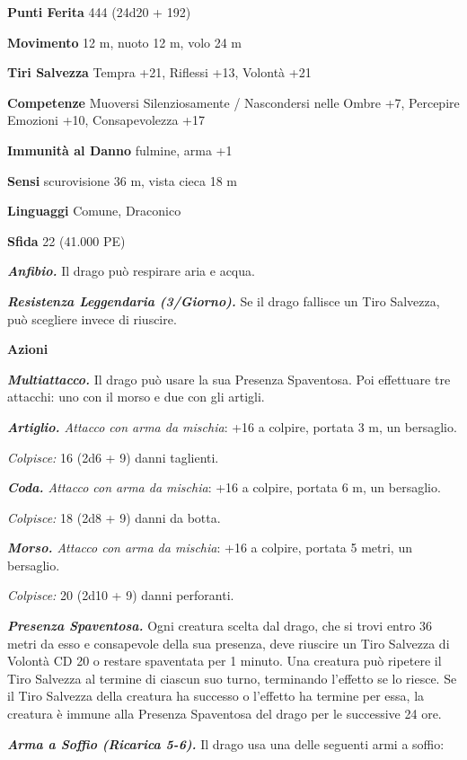 \begin{multicols}{2}
\textbf{Punti Ferita} 444 (24d20 + 192)

\textbf{Movimento} 12 m, nuoto 12 m, volo 24 m

\textbf{Tiri Salvezza} Tempra +21, Riflessi +13, Volontà +21

\textbf{Competenze} Muoversi Silenziosamente / Nascondersi nelle Ombre +7, Percepire Emozioni +10, Consapevolezza +17

\textbf{Immunità al Danno} fulmine, arma +1

\textbf{Sensi} scurovisione 36 m, vista cieca 18 m

\textbf{Linguaggi} Comune, Draconico

\textbf{Sfida} 22 (41.000 PE)

\emph{\textbf{Anfibio.}} Il drago può respirare aria e acqua.

\emph{\textbf{Resistenza Leggendaria (3/Giorno).}} Se il drago fallisce un Tiro Salvezza, può scegliere invece di riuscire.

\textbf{Azioni}

\emph{\textbf{Multiattacco.}} Il drago può usare la sua Presenza Spaventosa. Poi effettuare tre attacchi: uno con il morso e due con gli artigli.

\emph{\textbf{Artiglio.} Attacco con arma da mischia}: +16 a colpire, portata 3 m, un bersaglio.

\emph{Colpisce:} 16 (2d6 + 9) danni taglienti.

\emph{\textbf{Coda.} Attacco con arma da mischia}: +16 a colpire, portata 6 m, un bersaglio.

\emph{Colpisce:} 18 (2d8 + 9) danni da botta.

\emph{\textbf{Morso.} Attacco con arma da mischia}: +16 a colpire, portata 5 metri, un bersaglio.

\emph{Colpisce:} 20 (2d10 + 9) danni perforanti.

\emph{\textbf{Presenza Spaventosa.}} Ogni creatura scelta dal drago, che si trovi entro 36 metri da esso e consapevole della sua presenza, deve riuscire un Tiro Salvezza di Volontà CD 20 o restare spaventata per 1 minuto. Una creatura può ripetere il Tiro Salvezza al termine di ciascun suo turno, terminando l'effetto se lo riesce. Se il Tiro Salvezza della creatura ha successo o l'effetto ha termine per essa, la creatura è immune alla Presenza Spaventosa del drago per le successive 24 ore.

\emph{\textbf{Arma a Soffio (Ricarica 5-6).}} Il drago usa una delle seguenti armi a soffio:


\end{multicols}
